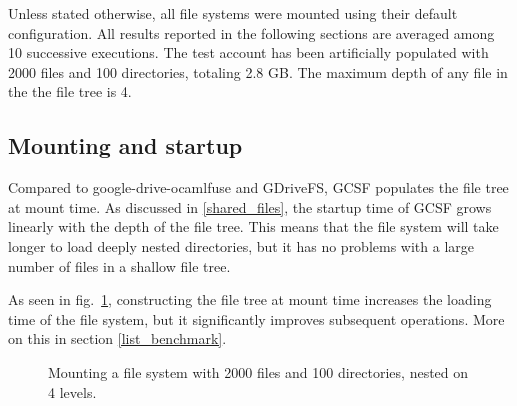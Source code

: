 Unless stated otherwise, all file systems were mounted using their default configuration. All results reported in the following sections are averaged among 10 successive executions. The test account has been artificially populated with 2000 files and 100 directories, totaling 2.8 GB. The maximum depth of any file in the the file tree is 4.

\subsection{Mounting and startup}

Compared to google-drive-ocamlfuse and GDriveFS, GCSF populates the file tree at mount time. As discussed in \ref{shared_files}, the startup time of GCSF grows linearly with the depth of the file tree. This means that the file system will take longer to load deeply nested directories, but it has no problems with a large number of files in a shallow file tree.

As seen in fig.~\ref{fig:mount_benchmark}, constructing the file tree at mount time increases the loading time of the file system, but it significantly improves subsequent operations. More on this in section \ref{list_benchmark}.


\begin{figure}[bpt]
\centering
{}
\caption{Mounting a file system with 2000 files and 100 directories, nested on 4 levels.}
\label{fig:mount_benchmark}
\end{figure}


